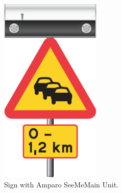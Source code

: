 \begin{subfigures}
\begin{figure}
\begin{minipage}{0.45\linewidth}
   \centering
   \includegraphics[height=9cm]{images/queueSeeMe}
  \caption{Sign with Amparo SeeMe\mtm Main Unit.}
  \label{fig-queueSeeMe}
  \end{minipage}
 \end{figure}

\end{subfigures}
